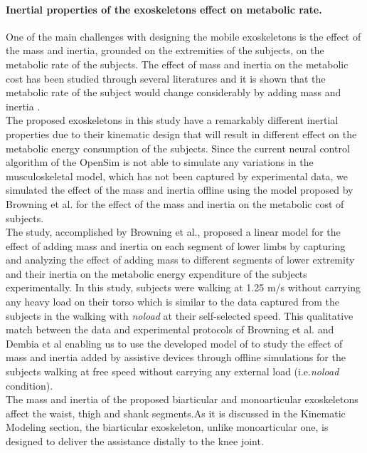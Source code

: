 \documentclass[10pt,letterpaper]{article}
\begin{document}
\paragraph*{Inertial properties of the exoskeletons effect on metabolic rate.} 
One of the main challenges with designing the mobile exoskeletons is the effect of the mass and inertia, grounded on the extremities of the subjects, on the metabolic rate of the subjects. The effect of mass and inertia on the metabolic cost has been studied through several literatures \cite{133,134} and it is shown that the metabolic rate of the subject would change considerably by adding mass and inertia \cite{133,134,135}.\\
The proposed exoskeletons in this study have a remarkably different inertial properties due to their kinematic design that will result in different effect on the metabolic energy consumption of the subjects. Since the current neural control algorithm of the OpenSim is not able to simulate any variations in the musculoskeletal model\cite{92}, which has not been captured by experimental data, we simulated the effect of the mass and inertia offline using the model proposed by Browning et al.\cite{133} for the effect of the mass and inertia on the metabolic cost of subjects.\\
The study, accomplished by Browning et al.\cite{133}, proposed a linear model for the effect of adding mass and inertia on each segment of lower limbs by capturing and analyzing the effect of adding mass to different segments of lower extremity and their inertia on the metabolic energy expenditure of the subjects experimentally. In this study, subjects were walking at 1.25 m/s without carrying any heavy load on their torso which is similar to the data captured from the subjects in the walking with \textit{\textit{noload}} at their self-selected speed\cite{93}. This qualitative match between the data and experimental protocols of Browning et al. and Dembia et al enabling us to use the developed model of \cite{133}  to study the effect of mass and inertia added by assistive devices through offline simulations for the subjects walking at free speed without carrying any external load (i.e.{\it noload} condition).\\
The mass and inertia of the proposed biarticular and monoarticular exoskeletons affect the waist, thigh and shank segments.As it is discussed in the Kinematic Modeling section, the biarticular exoskeleton, unlike monoarticular one, is designed to deliver the assistance distally to the knee joint.
\end{document}
